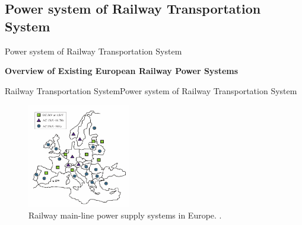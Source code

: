 \subsection{Power system of Railway Transportation System}

\begin{frame}{Power system of Railway Transportation System}
	\begin{block}{\textbf{Overview of Existing European Railway Power Systems}}
		
		
		

			

		
	\end{block}
\end{frame}

\begin{frame}{Railway Transportation System}{Power system of Railway Transportation System}


\begin{figure}[h!]
	\centering
	\includegraphics[width=0.4\textwidth,keepaspectratio]{figures/31.PowerS/abad2016}
	\caption{Railway main-line power supply systems in Europe. \cite{abad2016}.}
	\label{fig:abad2016}
\end{figure}
	
	
\end{frame}


